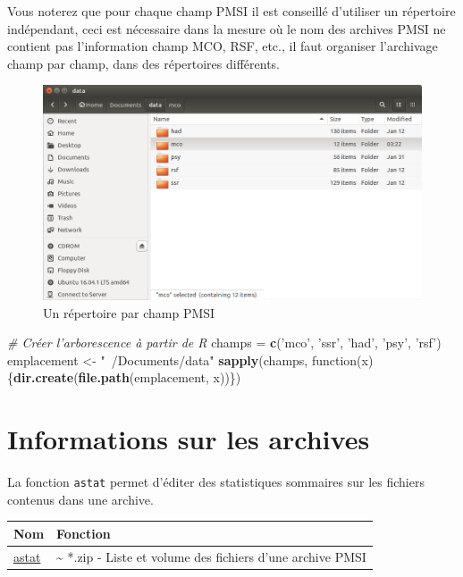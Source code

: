 \documentclass[]{book}
\newenvironment{Shaded}{\begin{snugshade}}{\end{snugshade}}
\newcommand{\KeywordTok}[1]{\textcolor[rgb]{0.13,0.29,0.53}{\textbf{{#1}}}}
\newcommand{\StringTok}[1]{\textcolor[rgb]{0.31,0.60,0.02}{{#1}}}
\newcommand{\CommentTok}[1]{\textcolor[rgb]{0.56,0.35,0.01}{\textit{{#1}}}}
\newcommand{\NormalTok}[1]{{#1}}
\begin{document}
Vous noterez que pour chaque champ PMSI il est conseillé d'utiliser un
répertoire indépendant, ceci est nécessaire dans la mesure où le nom des
archives PMSI ne contient pas l'information champ MCO, RSF, etc., il
faut organiser l'archivage champ par champ, dans des répertoires
différents.

\begin{figure}[htbp]
\centering
\includegraphics{images/champ_par_champ.png}
\caption{Un répertoire par champ PMSI}
\end{figure}

\begin{Shaded}
\begin{Highlighting}[]
\CommentTok{# Créer l'arborescence à partir de R}
\NormalTok{champs =}\StringTok{ }\KeywordTok{c}\NormalTok{(}\StringTok{'mco'}\NormalTok{, }\StringTok{'ssr'}\NormalTok{, }\StringTok{'had'}\NormalTok{, }\StringTok{'psy'}\NormalTok{, }\StringTok{'rsf'}\NormalTok{)}
\NormalTok{emplacement <-}\StringTok{ "~/Documents/data"}
\KeywordTok{sapply}\NormalTok{(champs, function(x)\{}\KeywordTok{dir.create}\NormalTok{(}\KeywordTok{file.path}\NormalTok{(emplacement, x))\})}
\end{Highlighting}
\end{Shaded}

\section{Informations sur les
archives}\label{informations-sur-les-archives}

La fonction \texttt{astat} permet d'éditer des statistiques sommaires
sur les fichiers contenus dans une archive.

\begin{longtable}[]{@{}ll@{}}
\toprule
Nom & Fonction\tabularnewline
\midrule
\endhead
\href{https://github.com/IM-APHP/pmeasyr/tree/master/Rd_md/astat.Rmd}{astat}
& \textasciitilde{} *.zip - Liste et volume des fichiers d'une archive
PMSI\tabularnewline
\bottomrule
\end{longtable}
\end{document}

